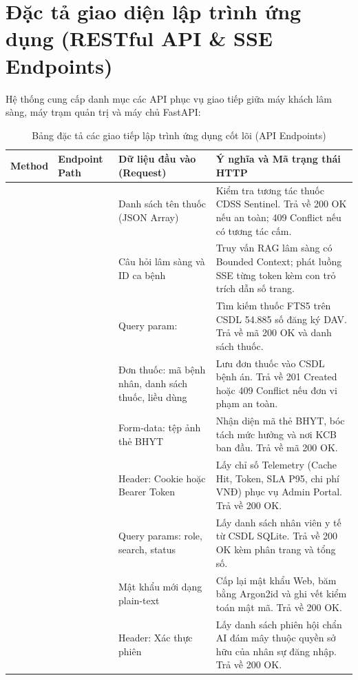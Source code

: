 \section{Đặc tả giao diện lập trình ứng dụng (RESTful API \& SSE Endpoints)}
\label{sec:api_specifications}

Hệ thống cung cấp danh mục các API phục vụ giao tiếp giữa máy khách lâm sàng, máy trạm quản trị và máy chủ FastAPI:

\begin{table}[htbp]
\centering
\small
\begin{tabularx}{\textwidth}{C{1.5cm} L{4.5cm} L{3.5cm} Y}
\toprule
\textbf{Method} & \textbf{Endpoint Path} & \textbf{Dữ liệu đầu vào (Request)} & \textbf{Ý nghĩa và Mã trạng thái HTTP} \\
\midrule
{} &  & Danh sách tên thuốc (JSON Array) & Kiểm tra tương tác thuốc CDSS Sentinel. Trả về 200 OK nếu an toàn; 409 Conflict nếu có tương tác cấm. \\
\addlinespace
{} &  & Câu hỏi lâm sàng và ID ca bệnh & Truy vấn RAG lâm sàng có Bounded Context; phát luồng SSE từng token kèm con trỏ trích dẫn số trang. \\
\addlinespace
{} &  & Query param:  & Tìm kiếm thuốc FTS5 trên CSDL 54.885 số đăng ký DAV. Trả về mã 200 OK và danh sách thuốc. \\
\addlinespace
{} &  & Đơn thuốc: mã bệnh nhân, danh sách thuốc, liều dùng & Lưu đơn thuốc vào CSDL bệnh án. Trả về 201 Created hoặc 409 Conflict nếu đơn vi phạm an toàn. \\
\addlinespace
{} &  & Form-data: tệp ảnh thẻ BHYT & Nhận diện mã thẻ BHYT, bóc tách mức hưởng và nơi KCB ban đầu. Trả về mã 200 OK. \\
\addlinespace
{} &  & Header: Cookie hoặc Bearer Token & Lấy chỉ số Telemetry (Cache Hit, Token, SLA P95, chi phí VNĐ) phục vụ Admin Portal. Trả về 200 OK. \\
\addlinespace
{} &  & Query params: role, search, status & Lấy danh sách nhân viên y tế từ CSDL SQLite. Trả về 200 OK kèm phân trang và tổng số. \\
\addlinespace
{} &  & Mật khẩu mới dạng plain-text & Cấp lại mật khẩu Web, băm bằng Argon2id và ghi vết kiểm toán mật mã. Trả về 200 OK. \\
\addlinespace
{} &  & Header: Xác thực phiên & Lấy danh sách phiên hội chẩn AI đám mây thuộc quyền sở hữu của nhân sự đăng nhập. Trả về 200 OK. \\
\bottomrule
\end{tabularx}
\caption{Bảng đặc tả các giao tiếp lập trình ứng dụng cốt lõi (API Endpoints)}
\end{table}
